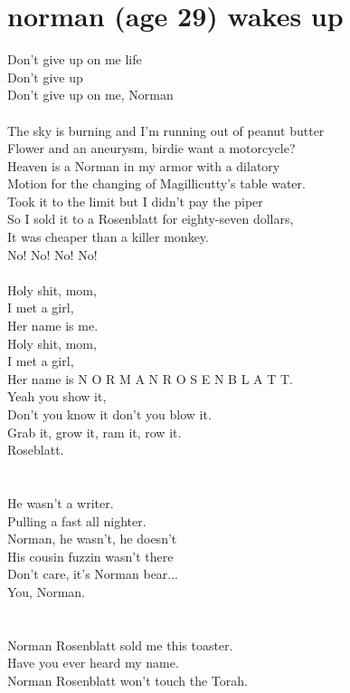 \documentclass[a4paper]{book}
\begin{document}
\section*{norman (age 29) wakes up}
Don't give up on me life\\
Don't give up\\
Don't give up on me, Norman\\\\
The sky is burning and I'm running out of peanut butter\\
Flower and an aneurysm, birdie want a motorcycle?\\
Heaven is a Norman in my armor with a dilatory\\
Motion for the changing of Magillicutty's table water.\\
Took it to the limit but I didn't pay the piper\\
So I sold it to a Rosenblatt for eighty-seven dollars,\\
It was cheaper than a killer monkey.\\
No! No! No! No!\\
\hfill\\
Holy shit, mom,\\
I met a girl,\\
Her name is me.\\
Holy shit, mom,\\
I met a girl,\\
Her name is N O R M A N R O S E N B L A T T.\\
Yeah you show it,\\
Don't you know it don't you blow it.\\
Grab it, grow it, ram it, row it.\\
Roseblatt.\\
\\\hfill\\
He wasn't a writer.\\
Pulling a fast all nighter.\\
Norman, he wasn't, he doesn't\\
His cousin fuzzin wasn't there\\
Don't care, it's Norman bear...\\
You, Norman.\\
\\\hfill\\
Norman Rosenblatt sold me this toaster.\\
Have you ever heard my name.\\
Norman Rosenblatt won't touch the Torah.\\
\end{document}
